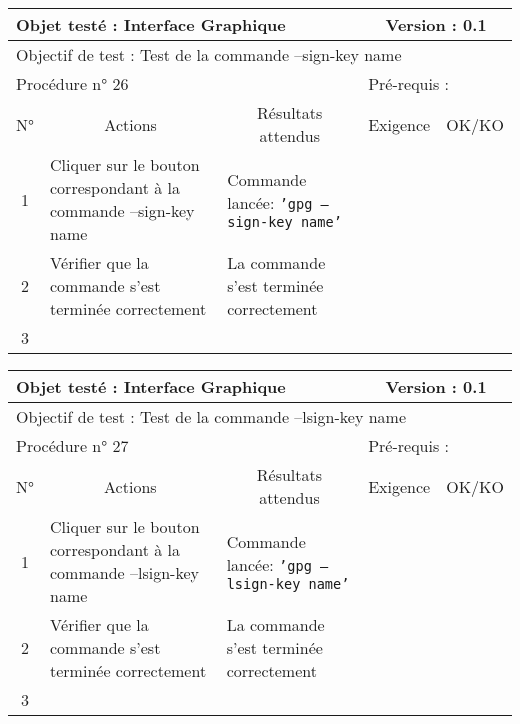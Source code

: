 \documentclass{../res/univ-projet}
\begin{document}
\begin{center}
\begin{tabular}{|c|p{5cm}|p{5cm}|p{1.5cm}|p{1.5cm}|}
\hline
\multicolumn{3}{|l|}{Objet testé : Interface Graphique} & \multicolumn{2}{c|}{Version : 0.1}\\ \hline
\multicolumn{5}{|l|}{Objectif de test : Test de la commande –sign-key name}\\ \hline
\multicolumn{3}{|l|}{Procédure n° 26} & \multicolumn{2}{p{3cm}|}{Pré-requis : }\\ \hline
\multicolumn{1}{|c|}{N°} & \multicolumn{1}{c|}{Actions} & \multicolumn{1}{c|}{Résultats attendus} & 
\multicolumn{1}{c|}{Exigence} & \multicolumn{1}{c|}{OK/KO}\\ \hline
1 & Cliquer sur le bouton correspondant à la commande –sign-key name & Commande lancée: \texttt{'gpg –sign-key name'} &  & \\
2 & Vérifier que la commande s'est terminée correctement & La commande s'est terminée correctement &  & \\
3 &  &  &  & \\ \hline
\end{tabular}
\vskip 2.2cm


\begin{tabular}{|c|p{5cm}|p{5cm}|p{1.5cm}|p{1.5cm}|}
\hline
\multicolumn{3}{|l|}{Objet testé : Interface Graphique} & \multicolumn{2}{c|}{Version : 0.1}\\ \hline
\multicolumn{5}{|l|}{Objectif de test : Test de la commande –lsign-key name}\\ \hline
\multicolumn{3}{|l|}{Procédure n° 27} & \multicolumn{2}{p{3cm}|}{Pré-requis : }\\ \hline
\multicolumn{1}{|c|}{N°} & \multicolumn{1}{c|}{Actions} & \multicolumn{1}{c|}{Résultats attendus} & 
\multicolumn{1}{c|}{Exigence} & \multicolumn{1}{c|}{OK/KO}\\ \hline
1 & Cliquer sur le bouton correspondant à la commande –lsign-key name & Commande lancée: \texttt{'gpg –lsign-key name'} &  & \\
2 & Vérifier que la commande s'est terminée correctement & La commande s'est terminée correctement &  & \\
3 &  &  &  & \\ \hline
\end{tabular}
\vskip 2.2cm



\end{center}
\end{document}
